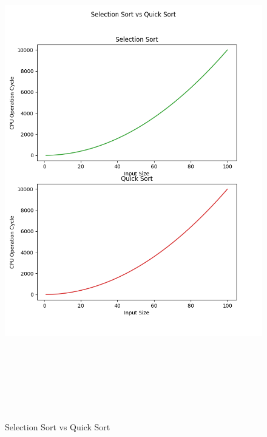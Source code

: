 \documentclass{article}
\begin{document}
\begin{figure}[h]
    \centerline{\includegraphics[width=7in,height=8.5in]{Selection Sort_Quick Sort.png}}
    \caption{Selection Sort vs Quick Sort}
\end{figure}
\end{document}
